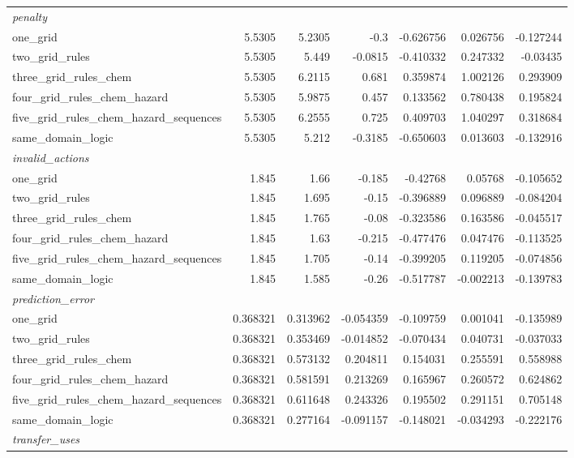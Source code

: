 \begin{tabular}{lrrrrrr}
  \multicolumn{7}{l}{\textit{penalty}} \\
  one_grid & 5.5305 & 5.2305 & -0.3 & -0.626756 & 0.026756 & -0.127244 \\
  two_grid_rules & 5.5305 & 5.449 & -0.0815 & -0.410332 & 0.247332 & -0.03435 \\
  three_grid_rules_chem & 5.5305 & 6.2115 & 0.681 & 0.359874 & 1.002126 & 0.293909 \\
  four_grid_rules_chem_hazard & 5.5305 & 5.9875 & 0.457 & 0.133562 & 0.780438 & 0.195824 \\
  five_grid_rules_chem_hazard_sequences & 5.5305 & 6.2555 & 0.725 & 0.409703 & 1.040297 & 0.318684 \\
  same_domain_logic & 5.5305 & 5.212 & -0.3185 & -0.650603 & 0.013603 & -0.132916 \\
  \multicolumn{7}{l}{\textit{invalid_actions}} \\
  one_grid & 1.845 & 1.66 & -0.185 & -0.42768 & 0.05768 & -0.105652 \\
  two_grid_rules & 1.845 & 1.695 & -0.15 & -0.396889 & 0.096889 & -0.084204 \\
  three_grid_rules_chem & 1.845 & 1.765 & -0.08 & -0.323586 & 0.163586 & -0.045517 \\
  four_grid_rules_chem_hazard & 1.845 & 1.63 & -0.215 & -0.477476 & 0.047476 & -0.113525 \\
  five_grid_rules_chem_hazard_sequences & 1.845 & 1.705 & -0.14 & -0.399205 & 0.119205 & -0.074856 \\
  same_domain_logic & 1.845 & 1.585 & -0.26 & -0.517787 & -0.002213 & -0.139783 \\
  \multicolumn{7}{l}{\textit{prediction_error}} \\
  one_grid & 0.368321 & 0.313962 & -0.054359 & -0.109759 & 0.001041 & -0.135989 \\
  two_grid_rules & 0.368321 & 0.353469 & -0.014852 & -0.070434 & 0.040731 & -0.037033 \\
  three_grid_rules_chem & 0.368321 & 0.573132 & 0.204811 & 0.154031 & 0.255591 & 0.558988 \\
  four_grid_rules_chem_hazard & 0.368321 & 0.581591 & 0.213269 & 0.165967 & 0.260572 & 0.624862 \\
  five_grid_rules_chem_hazard_sequences & 0.368321 & 0.611648 & 0.243326 & 0.195502 & 0.291151 & 0.705148 \\
  same_domain_logic & 0.368321 & 0.277164 & -0.091157 & -0.148021 & -0.034293 & -0.222176 \\
  \multicolumn{7}{l}{\textit{transfer_uses}} \\

\end{tabular}
